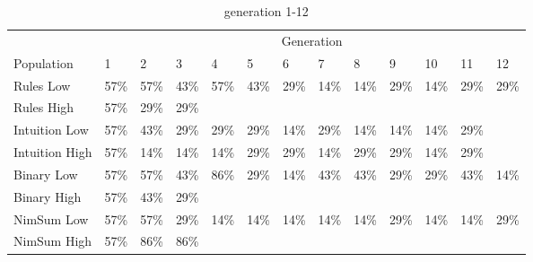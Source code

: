 \begin{table}
	\begin{subtable}{\linewidth}
	\centering
		\begin{tabular}{l|llllllllllll}\hline
		\multicolumn{1}{l}{} & \multicolumn{12}{c}{Generation} \\
		\multicolumn{1}{l}{Population} & 1 & 2 & 3 & 4 & 5 & 6 & 7 & 8 & 9 & 10 & 11 & 12\\\hline
		Rules Low & 57\% & 57\% & 43\% & 57\% & 43\% & 29\% & 14\% & 14\% & 29\% & 14\% & 29\% & 29\% \\
		Rules High & 57\% & 29\% & 29\% & \textemdash & \textemdash & \textemdash & \textemdash & \textemdash & \textemdash & \textemdash & \textemdash & \textemdash \\
		Intuition Low & 57\% & 43\% & 29\% & 29\% & 29\% & 14\% & 29\% & 14\% & 14\% & 14\% & 29\% & \textemdash \\
		Intuition High & 57\% & 14\% & 14\% & 14\% & 29\% & 29\% & 14\% & 29\% & 29\% & 14\% & 29\% & \textemdash \\
		Binary Low & 57\% & 57\% & 43\% & 86\% & 29\% & 14\% & 43\% & 43\% & 29\% & 29\% & 43\% & 14\% \\
		Binary High & 57\% & 43\% & 29\% & \textemdash & \textemdash & \textemdash & \textemdash & \textemdash & \textemdash & \textemdash & \textemdash & \textemdash \\
		NimSum Low & 57\% & 57\% & 29\% & 14\% & 14\% & 14\% & 14\% & 14\% & 29\% & 14\% & 14\% & 29\% \\
		NimSum High & 57\% & 86\% & 86\% & \textemdash & \textemdash & \textemdash & \textemdash & \textemdash & \textemdash & \textemdash & \textemdash & \textemdash \\
		\end{tabular}
	\caption{generation 1-12}
	\end{subtable}


\end{table}
